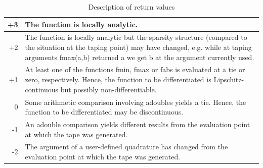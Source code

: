 \documentclass[11pt,twoside]{article}
\begin{document}
\begin{table}[h]
\center\small
\begin{tabular}{|r|l|}\hline
 +3 &
\begin{minipage}{12.5cm}
\vspace*{1ex}
The function is locally analytic.
\vspace*{1ex}
\end{minipage} \\ \hline
 +2 &
\begin{minipage}{12.5cm}
\vspace*{1ex}
The function is locally analytic but the sparsity
structure (compared to the situation at the  taping point)
may have changed, e.g. while at taping arguments
{\sf fmax(a,b)} returned {\sf a} we get {\sf b} at
the argument currently used.
\vspace*{1ex}
\end{minipage} \\ \hline
 +1 &
\begin{minipage}{12.5cm}
\vspace*{1ex}
At least one of the functions {\sf fmin}, {\sf fmax} or {\sf fabs}
is  evaluated at a tie or zero, respectively.  Hence, the function to be differentiated is
Lipschitz-continuous but possibly non-differentiable.
\vspace*{1ex}
\end{minipage} \\ \hline
 0 &
\begin{minipage}{12.5cm}
\vspace*{1ex}
Some arithmetic comparison involving {\sf adouble}s yields a tie.
Hence, the function to be differentiated  may be discontinuous.
\vspace*{1ex}
\end{minipage} \\ \hline
 -1 &
\begin{minipage}{12.5cm}
\vspace*{1ex}
An {\sf adouble} comparison yields different results
from the evaluation point at which the tape was generated.
\vspace*{1ex}
\end{minipage} \\ \hline
 -2 &
\begin{minipage}{12.5cm}
\vspace*{1ex}
The argument of a user-defined quadrature has changed
from the evaluation point at which the tape was generated.
\vspace*{1ex}
\end{minipage} \\ \hline
\end{tabular}
\caption{Description of return values}
\label{retvalues}
\end{table}                            
\end{document}
